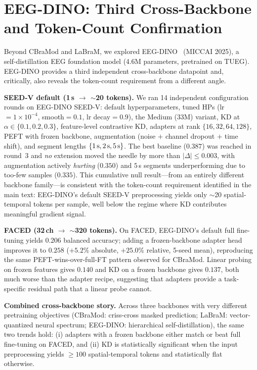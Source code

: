 \section{EEG-DINO: Third Cross-Backbone and Token-Count Confirmation}
\label{sec:supp_eegdino}

Beyond CBraMod and LaBraM, we explored EEG-DINO~\cite{wang2025eegdino} (MICCAI 2025), a self-distillation EEG foundation model (4.6M parameters, pretrained on TUEG). EEG-DINO provides a third independent cross-backbone datapoint and, critically, also reveals the token-count requirement from a different angle.

\noindent\textbf{SEED-V default (1\,s $\to$ $\sim$20 tokens).} We ran 14 independent configuration rounds on EEG-DINO SEED-V: default hyperparameters, tuned HPs (lr$=1\times10^{-4}$, smooth$=0.1$, lr decay$=0.9$), the Medium (33M) variant, KD at $\alpha \in \{0.1, 0.2, 0.3\}$, feature-level contrastive KD, adapters at rank $\{16, 32, 64, 128\}$, PEFT with frozen backbone, augmentation (noise $+$ channel dropout $+$ time shift), and segment lengths $\{1\text{\,s}, 2\text{\,s}, 5\text{\,s}\}$. The best baseline ($0.387$) was reached in round~3 and \emph{no} extension moved the needle by more than $|\Delta| \leq 0.003$, with augmentation actively \emph{hurting} ($0.350$) and $5$\,s segments underperforming due to too-few samples ($0.335$). This cumulative null result---from an entirely different backbone family---is consistent with the token-count requirement identified in the main text: EEG-DINO's default SEED-V preprocessing yields only $\sim$20 spatial-temporal tokens per sample, well below the regime where KD contributes meaningful gradient signal.

\noindent\textbf{FACED (32\,ch $\to$ $\sim$320 tokens).} On FACED, EEG-DINO's default full fine-tuning yields $0.206$ balanced accuracy; adding a frozen-backbone adapter head improves it to $0.258$ ($+5.2\%$ absolute, $+25.0\%$ relative, 5-seed mean), reproducing the same PEFT-wins-over-full-FT pattern observed for CBraMod. Linear probing on frozen features gives $0.140$ and KD on a frozen backbone gives $0.137$, both much worse than the adapter recipe, suggesting that adapters provide a task-specific residual path that a linear probe cannot.

\noindent\textbf{Combined cross-backbone story.} Across three backbones with very different pretraining objectives (CBraMod: criss-cross masked prediction; LaBraM: vector-quantized neural spectrum; EEG-DINO: hierarchical self-distillation), the same two trends hold: (i) adapters with a frozen backbone either match or beat full fine-tuning on FACED, and (ii) KD is statistically significant when the input preprocessing yields $\geq 100$ spatial-temporal tokens and statistically flat otherwise.

